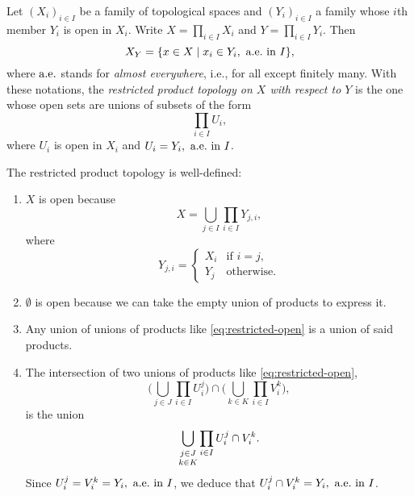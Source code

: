 \begin{defn}
    Let $(X_i)_{i\in I}$ be a family of topological spaces and $(Y_i)_{i\in I}$ a family whose $i$th member $Y_i$ is open in $X_i$. Write $X=\prod_{i\in I}X_i$ and $Y=\prod_{i\in I}Y_i$. Then
    $$
        X_Y =\set{x\in X
            \mid x_i\in Y_i \aew[I]},
    $$
    where $\aew$ stands for \textit{almost everywhere}, i.e., for all except finitely many. With these notations, the \textsl{restricted product topology on $X$ with respect to $Y$} is the one whose open sets are unions of subsets of the form
    \begin{equation}\label{eq:restricted-open}
        \prod_{i\in I} U_i,\tag{$\ast$}
    \end{equation}
    where $U_i$ is open in $X_i$ and $U_i=Y_i \aew[I]$.
\end{defn}

\begin{rem}
    The restricted product topology is well-defined:
    \begin{enumerate}[\rm i)]
        \item $X$ is open because
        $$
            X = \bigcup_{j\in I}\prod_{i\in I}Y_{j,i},
        $$
        where
        $$
            Y_{j,i} = \begin{cases}
                X_i     &\text{if }i=j,\\
                Y_j     &\text{otherwise}.
            \end{cases}
        $$

        \item $\emptyset$ is open because we can take the empty union of products to express it.

        \item Any union of unions of products like \eqref{eq:restricted-open} is a union of said products.

        \item The intersection of two unions of products like \eqref{eq:restricted-open}, 
        $$
            \Big(\bigcup_{j\in J}\prod_{i\in I}U^j_i\Big)
                \cap\Big(\bigcup_{k\in K}\prod_{i\in I}V^k_i\Big),
        $$
        is the union
        $$
            \bigcup_{\substack{j\in J\vphantom|\\k\in K\vphantom|}}
                \prod_{i\in I}U^j_i\cap V^k_i.
        $$
        Since $U^j_i=V^k_i=Y_i\aew[I]$, we deduce that $U^j_i\cap V^k_i=Y_i\aew[I]$.
    \end{enumerate}
\end{rem}

